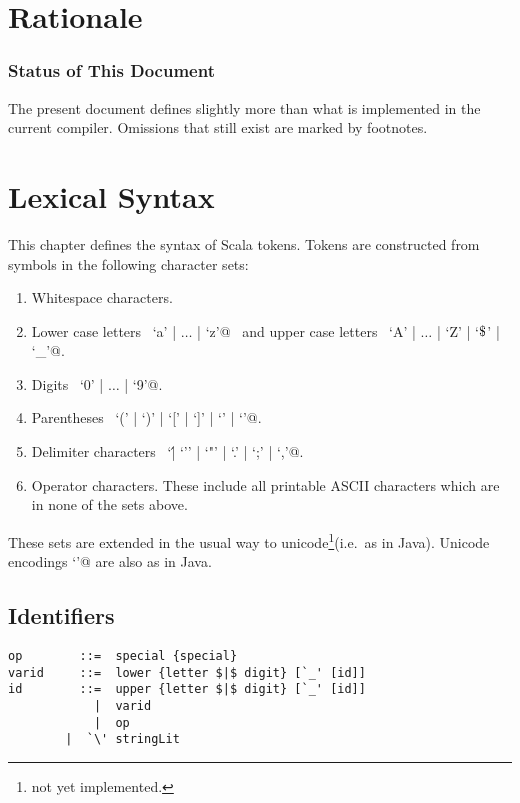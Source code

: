 \documentclass[a4paper,12pt,twoside,titlepage]{book}
\renewcommand{\todo}[1]{{$\clubsuit$\bf todo: #1$\spadesuit$}}
\newcommand{\notyet}{\footnote{not yet implemented.}}
\begin{document}
\frontmatter
\makedoctitle
\clearemptydoublepage
\tableofcontents
\mainmatter
\sloppy



\chapter{Rationale}



\subsection*{Status of This Document}

The present document defines slightly more than what is implemented in
the current compiler. Omissions that still exist are marked by footnotes.

\chapter{Lexical Syntax}

This chapter defines the syntax of Scala tokens. Tokens are
constructed from symbols in the following character sets:
\begin{enumerate}
\item Whitespace characters.
\item Lower case letters ~\lstinline@`a' | $\ldots$ | `z'@~  and
upper case letters ~\lstinline@`A' | $\ldots$ | `Z' | `$\mbox{\$}$' | `_'@.
\item Digits ~\lstinline@`0' | $\ldots$ | `9'@.
\item Parentheses ~\lstinline@`(' | `)' | `[' | `]' | `{' | `}'@.
\item Delimiter characters ~\lstinline@`\' | `'' | `"' | `.' | `;' | `,'@.
\item Operator characters. These include all printable ASCII characters
which are in none of the sets above.
\end{enumerate}

These sets are extended in the usual way to unicode\notyet (i.e.\ as in Java).
Unicode encodings \lstinline@`\uXXXX'@ are also as in Java.

\section{Identifiers}

\syntax\begin{lstlisting}
op        ::=  special {special}
varid     ::=  lower {letter $|$ digit} [`_' [id]]
id        ::=  upper {letter $|$ digit} [`_' [id]]
            |  varid
            |  op
	    |  `\' stringLit
\end{lstlisting}
\end{document}
